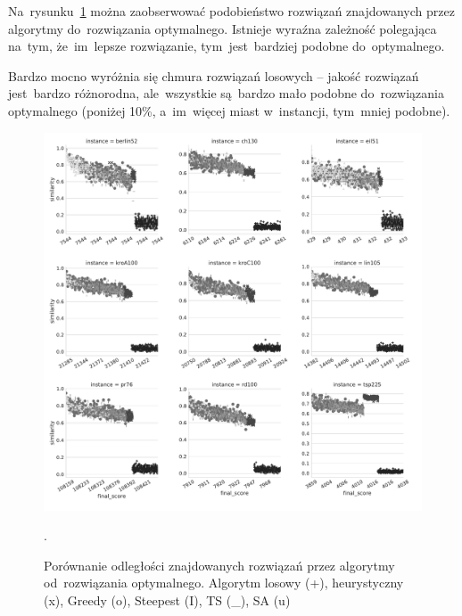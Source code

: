 Na~rysunku~\ref{fig:sim} można zaobserwować podobieństwo rozwiązań znajdowanych przez algorytmy do~rozwiązania optymalnego. Istnieje wyraźna zależność polegająca na~tym, że~im~lepsze rozwiązanie, tym~jest~bardziej podobne do~optymalnego.

Bardzo mocno wyróżnia się chmura rozwiązań losowych -- jakość rozwiązań jest~bardzo różnorodna, ale~wszystkie są~bardzo mało podobne do~rozwiązania optymalnego (poniżej 10\%, a~im~więcej miast w~instancji, tym~mniej podobne).

\begin{figure}[H]
\begin{center}
\includegraphics[width=1.0\textwidth]{graphs/similarity_comparision.pdf}
\end{center}
\caption{Porównanie odległości znajdowanych rozwiązań przez algorytmy od~rozwiązania optymalnego. Algorytm losowy (+), heurystyczny (x), Greedy (o), Steepest (I), TS (\_), SA (u)}.
\label{fig:sim}
\end{figure}